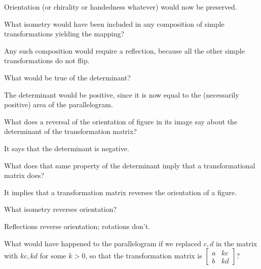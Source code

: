 \documentclass[../gatm_answers.tex]{subfiles}
\begin{document}
\begin{iinner_problem}
\begin{iinner_problem}
\begin{iinner_problem}
Orientation (or chirality or handedness whatever) would now be preserved.

\begin{iinner_problem}
\item What isometry would have been included in any composition of simple transformations yielding the mapping?
\end{iinner_problem}

Any such composition would require a reflection, because all the other simple transformations do not flip.

\begin{iinner_problem}
\item What would be true of the determinant?
\end{iinner_problem}

The determinant would be positive, since it is now equal to the (necessarily positive) area of the parallelogram.

\begin{inner_problem}
\item
\end{inner_problem}

\begin{iinner_problem}[start=1]
\item What does a reversal of the orientation of figure in its image say about the determinant of the transformation matrix?
\end{iinner_problem}

It says that the determinant is negative.

\begin{iinner_problem}
\item What does that same property of the determinant imply that a transformational matrix does?
\end{iinner_problem}

It implies that a transformation matrix reverses the orientation of a figure.

\begin{iinner_problem}
\item What isometry reverses orientation?
\end{iinner_problem}

Reflections reverse orientation; rotations don't.

\begin{inner_problem}
\item
\end{inner_problem}

\begin{iinner_problem}[start=1]
\item What would have happened to the parallelogram if we replaced $c,d$ in the matrix with $kc,kd$ for some $k>0$, so that the transformation matrix is $\left[\begin{smallmatrix} a & kc \\ b & kd \end{smallmatrix}\right]$?
\end{iinner_problem}


\end{iinner_problem}
\end{iinner_problem}
\end{iinner_problem}
\end{document}
